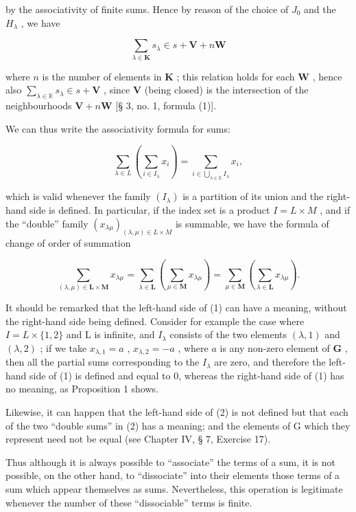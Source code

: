 by the associativity of finite sums. Hence by reason of the choice of \(J_{0}\) and the \(H_{\lambda}\) , we have

\[
\sum_ {\lambda \in \mathbf {K}} s _ {\lambda} \in s + \mathbf {V} + n \mathbf {W}
\]

where \(n\) is the number of elements in \(\mathbf{K}\) ; this relation holds for each \(\mathbf{W}\) , hence also \(\sum_{\lambda \in \mathbb{K}} s_{\lambda} \in s + \mathbf{V}\) , since \(\mathbf{V}\) (being closed) is the intersection of the neighbourhoods \(\mathbf{V} + n\mathbf{W}\) {[}§ 3, no. 1, formula (1){]}.

We can thus write the associativity formula for sums:

\[
\sum_ {\lambda \in L} (\sum_ {i \in I _ {\lambda}} x _ {i}) = \sum_ {i \in \bigcup_ {\lambda \in L} I _ {\lambda}} x _ {i},\tag{1}
\]

which is valid whenever the family \((I_{\lambda})\) is a partition of its union and the right-hand side is defined. In particular, if the index set is a product \(I = L \times M\) , and if the ``double'' family \((x_{\lambda\mu})_{(\lambda,\mu) \in L \times M}\) is summable, we have the formula of change of order of summation

\[
\sum_ {(\lambda , \mu) \in \mathbf {L} \times \mathbf {M}} x _ {\lambda \mu} = \sum_ {\lambda \in \mathbf {L}} (\sum_ {\mu \in \mathbf {M}} x _ {\lambda \mu}) = \sum_ {\mu \in \mathbf {M}} (\sum_ {\lambda \in \mathbf {L}} x _ {\lambda \mu}).\tag{2}
\]

It should be remarked that the left-hand side of (1) can have a meaning, without the right-hand side being defined. Consider for example the case where \(I = L \times \{1, 2\}\) and L is infinite, and \(I_{\lambda}\) consists of the two elements \((\lambda, 1)\) and \((\lambda, 2)\) ; if we take \(x_{\lambda,1} = a\) , \(x_{\lambda,2} = -a\) , where \(a\) is any non-zero element of \(\mathbf{G}\) , then all the partial sums corresponding to the \(I_{\lambda}\) are zero, and therefore the left-hand side of (1) is defined and equal to 0, whereas the right-hand side of (1) has no meaning, as Proposition 1 shows.

Likewise, it can happen that the left-hand side of (2) is not defined but that each of the two ``double sums'' in (2) has a meaning; and the elements of G which they represent need not be equal (see Chapter IV, § 7, Exercise 17).

Thus although it is always possible to ``associate'' the terms of a sum, it is not possible, on the other hand, to ``dissociate'' into their elements those terms of a sum which appear themselves as sums. Nevertheless, this operation is legitimate whenever the number of these ``dissociable'' terms is finite.

